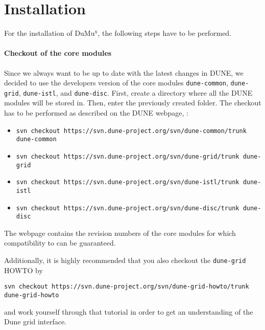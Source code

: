 \section{Installation} 
\label{install}

For the installation of DuMu$^\text{x}$, the following steps have to be performed.  

\paragraph{Checkout of the core modules}
Since we always want to be up to date with the latest changes in DUNE, 
we decided to use the developers version of the core modules 
\texttt{dune-common}, \texttt{dune-grid}, \texttt{dune-istl}, and \texttt{dune-disc}.  
First, create a directory where all the DUNE modules will be stored in. Then, enter the previously created folder. 
The checkout has to be performed as described on 
the DUNE webpage, \cite{DUNE-HP}: 
\begin{itemize}
\item \texttt{svn checkout https://svn.dune-project.org/svn/dune-common/trunk dune-common}
\item \texttt{svn checkout https://svn.dune-project.org/svn/dune-grid/trunk dune-grid}
\item \texttt{svn checkout https://svn.dune-project.org/svn/dune-istl/trunk dune-istl}
\item \texttt{svn checkout https://svn.dune-project.org/svn/dune-disc/trunk dune-disc}
\end{itemize} 
The \Dumux webpage \cite{dumux-hp} contains the revision numbers of the core modules 
for which compatibility to \Dumux can be guaranteed. 

Additionally, it is highly recommended that you also checkout the \texttt{dune-grid} HOWTO 
by 
\begin{center}
\texttt{svn checkout https://svn.dune-project.org/svn/dune-grid-howto/trunk dune-grid-howto}
\end{center}
and work yourself through that tutorial in order to get an understanding of 
the Dune grid interface. 

